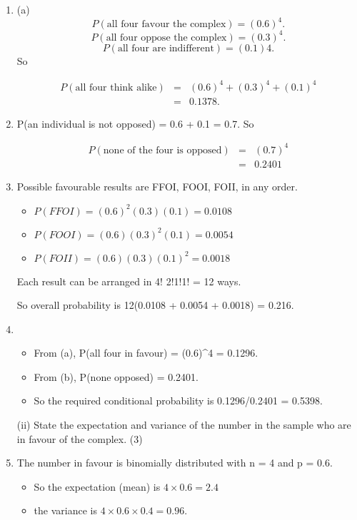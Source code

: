 \documentclass[a4paper,12pt]{article}
\begin{document}
\begin{enumerate}

\item (a)
\[P(\mbox{all four favour the complex}) = (0.6)^4.\]
\[P(\mbox{all four oppose the complex}) = (0.3)^4.\]
\[P(\mbox{all four are indifferent}) = (0.1)4.\]
So 

\begin{eqnarray*}
P(\mbox{all four think alike}) 
&=& (0.6)^4 + (0.3)^4 + (0.1)^4 \\ &=& 0.1378.
\end{eqnarray*}


\item  P(an individual is not opposed) = 0.6 + 0.1 = 0.7.
So 

\begin{eqnarray*}
P(\mbox{none of the four is opposed}) &=& (0.7)^4\\ &=& 0.2401
\end{eqnarray*}


\item  Possible favourable results are FFOI, FOOI, FOII, in any order.
\begin{itemize}
\item $P(FFOI) = (0.6)^2(0.3)(0.1) = 0.0108$
\item $P(FOOI) = (0.6)(0.3)^2(0.1) = 0.0054$
\item $P(FOII) = (0.6)(0.3)(0.1)^2 = 0.0018$
\end{itemize}

Each result can be arranged in 4!
2!1!1!
= 12 ways.

So overall probability is 12(0.0108 + 0.0054 + 0.0018) = 0.216.

\item 

\begin{itemize}
\item From (a), P(all four in favour) = (0.6)^4 = 0.1296.
\item From (b), P(none
opposed) = 0.2401. 
\item So the required conditional probability is
0.1296/0.2401 = 0.5398.
\end{itemize} 


\begin{framed}
(ii) State the expectation and variance of the number in the sample who are in favour of the complex. (3) 
\end{framed}
\item The number in favour is binomially distributed with n = 4 and p = 0.6. 
\begin{itemize}
    \item So the
expectation (mean) is $4 \times 0.6 = 2.4$ 
\item the variance is $4 \times 0.6 \times 0.4 = 0.96$.
\end{itemize}


\end{enumerate}
\end{document}
